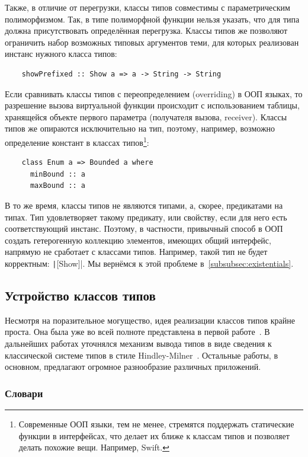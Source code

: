 Также, в отличие от перегрузки, классы типов совместимы с параметрическим полиморфизмом.
Так, в типе полиморфной функции нельзя указать, что для типа должна присутствовать определённая перегрузка.
Классы типов же позволяют ограничить набор возможных типовых аргументов теми, для которых реализован инстанс нужного класса типов:
\begin{verbatim}
    showPrefixed :: Show a => a -> String -> String
\end{verbatim}

Если сравнивать классы типов с переопределением (overriding) в ООП языках, то разрешение вызова виртуальной функции происходит с использованием таблицы, хранящейся объекте первого параметра (получателя вызова, receiver).
Классы типов же опираются исключительно на тип, поэтому, например, возможно определение констант в классах типов\footnote{Современные ООП языки, тем не менее, стремятся поддержать статические функции в интерфейсах, что делает их ближе к классам типов и позволяет делать похожие вещи. Например, Swift.}: %
\begin{verbatim}
    class Enum a => Bounded a where
      minBound :: a
      maxBound :: a
\end{verbatim}

В то же время, классы типов не являются типами, а, скорее, предикатами на типах.
Тип удовлетворяет такому предикату, или свойству, если для него есть соответствующий инстанс.
Поэтому, в частности, привычный способ в ООП создать гетерогенную коллекцию элементов, имеющих общий интерфейс, напрямую не сработает с классами типов.
Например, такой тип не будет корректным: \texttt|[Show]|.
Мы вернёмся к этой проблеме в~\ref{subsubsec:existentials}.

\subsection{Устройство классов типов}

Несмотря на поразительное могущество, идея реализации классов типов крайне проста.
Она была уже во всей полноте представлена в первой работе~\cite{wadler1989make}.
В дальнейших работах уточнялся механизм вывода типов в виде сведения к классической системе типов в стиле Hindley-Milner~\cite{hall1996type}.
Остальные работы, в основном, предлагают огромное разнообразие различных приложений.

\subsubsection{Словари} \label{subsubsec:tc-dict}

